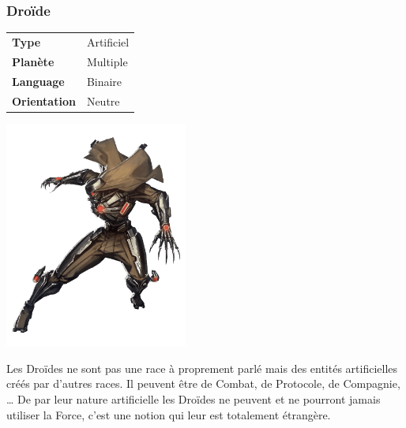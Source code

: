 \subsubsection{Droïde}
\begin{samepage}
	\vspace{4\baselineskip}
	\begin{tabular}{ l l }
		\textbf{Type} 			& Artificiel \\
	   	\textbf{Planète} 		& Multiple \\
	   	\textbf{Language} 		& Binaire \\
	   	\textbf{Orientation} 	& Neutre \\
	\end{tabular}

	\vspace{-11\baselineskip}

	\begin{flushright}
		\includegraphics[width=6cm]{img/personnages/races/droide.png}
	\end{flushright}
	\vspace{-2\baselineskip}
\end{samepage}

Les Droïdes ne sont pas une race à proprement parlé mais des entités artificielles créés par d'autres races. Il peuvent être de Combat, de Protocole, de Compagnie, \ldots 
De par leur nature artificielle les Droïdes ne peuvent et ne pourront jamais utiliser la Force, c'est une notion qui leur est totalement étrangère.

